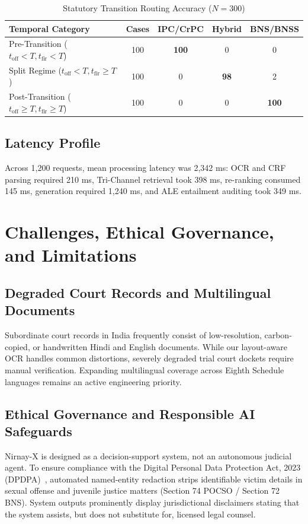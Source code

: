 \documentclass[conference]{IEEEtran}
\begin{document}
\begin{table}[!t]
\caption{Statutory Transition Routing Accuracy ($N=300$)}
\label{tab:transition_matrix}
\centering
\small
\begin{tabularx}{\columnwidth}{lcccc}
\toprule
\textbf{Temporal Category} & \textbf{Cases} & \textbf{IPC/CrPC} & \textbf{Hybrid} & \textbf{BNS/BNSS} \\
\midrule
Pre-Transition ($t_{\text{off}} < T, t_{\text{fir}} < T$) & 100 & \textbf{100} & 0 & 0 \\
Split Regime ($t_{\text{off}} < T, t_{\text{fir}} \ge T$) & 100 & 0 & \textbf{98} & 2 \\
Post-Transition ($t_{\text{off}} \ge T, t_{\text{fir}} \ge T$) & 100 & 0 & 0 & \textbf{100} \\
\bottomrule
\end{tabularx}
\end{table}

\subsection{Latency Profile}
Across 1,200 requests, mean processing latency was 2,342 ms: OCR and CRF parsing required 210 ms, Tri-Channel retrieval took 398 ms, re-ranking consumed 145 ms, generation required 1,240 ms, and ALE entailment auditing took 349 ms.

\section{Challenges, Ethical Governance, and Limitations}

\subsection{Degraded Court Records and Multilingual Documents}
Subordinate court records in India frequently consist of low-resolution, carbon-copied, or handwritten Hindi and English documents. While our layout-aware OCR handles common distortions, severely degraded trial court dockets require manual verification. Expanding multilingual coverage across Eighth Schedule languages remains an active engineering priority.

\subsection{Ethical Governance and Responsible AI Safeguards}
Nirnay-X is designed as a decision-support system, not an autonomous judicial agent. To ensure compliance with the Digital Personal Data Protection Act, 2023 (DPDPA)~\cite{dpdpa2023}, automated named-entity redaction strips identifiable victim details in sexual offense and juvenile justice matters (Section 74 POCSO / Section 72 BNS). System outputs prominently display jurisdictional disclaimers stating that the system assists, but does not substitute for, licensed legal counsel.
\end{document}
